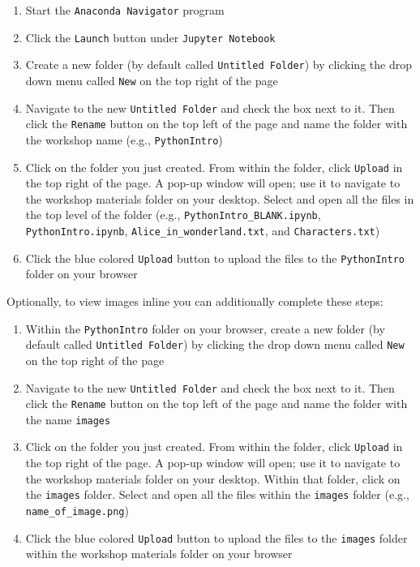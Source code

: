 \documentclass[
]{book}
\providecommand{\tightlist}{%
  \setlength{\itemsep}{0pt}\setlength{\parskip}{0pt}}
\begin{document}
\begin{enumerate}
\def\labelenumi{\arabic{enumi}.}
\tightlist
\item
  Start the \texttt{Anaconda\ Navigator} program
\item
  Click the \texttt{Launch} button under \texttt{Jupyter\ Notebook}
\item
  Create a new folder (by default called \texttt{Untitled\ Folder}) by clicking the drop down menu called \texttt{New} on the top right of the page
\item
  Navigate to the new \texttt{Untitled\ Folder} and check the box next to it. Then click the \texttt{Rename} button on the top left of the page and name the folder with the workshop name (e.g., \texttt{PythonIntro})
\item
  Click on the folder you just created. From within the folder, click \texttt{Upload} in the top right of the page. A pop-up window will open; use it to navigate to the workshop materials folder on your desktop. Select and open all the files in the top level of the folder (e.g., \texttt{PythonIntro\_BLANK.ipynb}, \texttt{PythonIntro.ipynb}, \texttt{Alice\_in\_wonderland.txt}, and \texttt{Characters.txt})
\item
  Click the blue colored \texttt{Upload} button to upload the files to the \texttt{PythonIntro} folder on your browser
\end{enumerate}

Optionally, to view images inline you can additionally complete these steps:

\begin{enumerate}
\def\labelenumi{\arabic{enumi}.}
\setcounter{enumi}{6}
\tightlist
\item
  Within the \texttt{PythonIntro} folder on your browser, create a new folder (by default called \texttt{Untitled\ Folder}) by clicking the drop down menu called \texttt{New} on the top right of the page
\item
  Navigate to the new \texttt{Untitled\ Folder} and check the box next to it. Then click the \texttt{Rename} button on the top left of the page and name the folder with the name \texttt{images}
\item
  Click on the folder you just created. From within the folder, click \texttt{Upload} in the top right of the page. A pop-up window will open; use it to navigate to the workshop materials folder on your desktop. Within that folder, click on the \texttt{images} folder. Select and open all the files within the \texttt{images} folder (e.g., \texttt{name\_of\_image.png})
\item
  Click the blue colored \texttt{Upload} button to upload the files to the \texttt{images} folder within the workshop materials folder on your browser
\end{enumerate}
\end{document}
